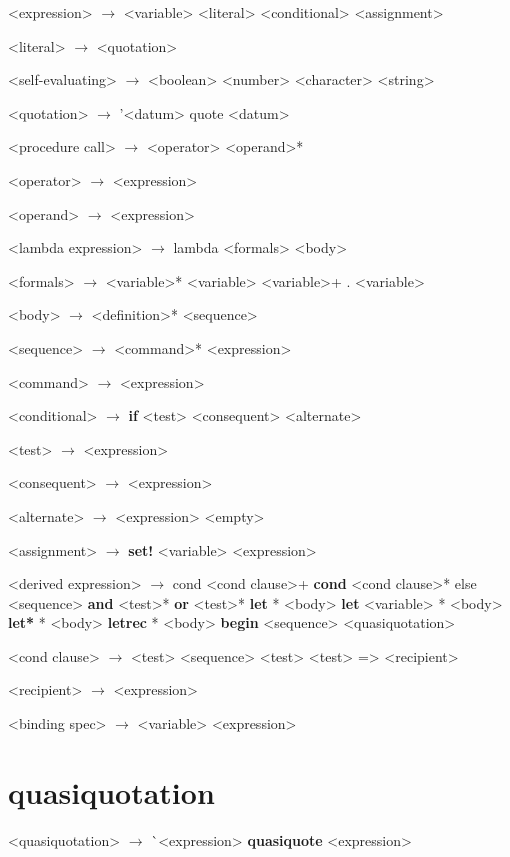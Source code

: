 \documentclass[11pt]{report}
\begin{document}
\begin{grammar}
  <expression> $\longrightarrow$ <variable>
  \alt <literal>
  \alt <conditional>
  \alt <assignment>

  <literal> $\longrightarrow$ <quotation> 

  <self-evaluating> $\longrightarrow$ <boolean> \alt <number>
  \alt <character> \alt <string>

  <quotation> $\longrightarrow$ '<datum> \alt \bop quote <datum> \bcp

  <procedure call> $\longrightarrow$ \bop <operator> <operand>* \bcp

  <operator> $\longrightarrow$ <expression>

  <operand> $\longrightarrow$ <expression>

  <lambda expression> $\longrightarrow$ \bop lambda <formals> <body> \bcp

  <formals> $\longrightarrow$ \bop <variable>* \bcp \alt <variable>
  \alt \bop <variable>+  .  <variable> \bcp

  <body> $\longrightarrow$ <definition>* <sequence>

  <sequence> $\longrightarrow$ <command>* <expression>

  <command> $\longrightarrow$ <expression>

  <conditional> $\longrightarrow$ \bop \textbf{if} <test> <consequent> <alternate> \bcp

  <test> $\longrightarrow$ <expression>

  <consequent> $\longrightarrow$ <expression>

  <alternate> $\longrightarrow$ <expression> \alt <empty>

  <assignment> $\longrightarrow$ \bop \textbf{set!} <variable> <expression> \bcp

  <derived expression> $\longrightarrow$ \bop cond <cond clause>+ \bcp
  \alt \bop \textbf{cond} <cond clause>* \bop else <sequence> \bcp \bcp
  \alt \bop \textbf{and} <test>* \bcp
  \alt \bop \textbf{or} <test>* \bcp
  \alt \bop \textbf{let} * \bcp <body> \bcp
  \alt \bop \textbf{let} <variable> * \bcp <body> \bcp
  \alt \bop \textbf{let*} * \bcp <body> \bcp
  \alt \bop \textbf{letrec} * \bcp <body> \bcp
  \alt \bop \textbf{begin} <sequence> \bcp
  \alt <quasiquotation>

  <cond clause> $\longrightarrow$ \bop <test> <sequence> \bcp
  \alt \bop <test> \bcp
  \alt \bop <test> => <recipient> \bcp

  <recipient> $\longrightarrow$ <expression>


  <binding spec> $\longrightarrow$ \bop <variable> <expression> \bcp

\end{grammar}

\section{quasiquotation}
\begin{grammar}
  <quasiquotation> $\longrightarrow$ \`{}<expression>
  \alt \bop \textbf{quasiquote} <expression> \bcp
\end{grammar}
\end{document}
